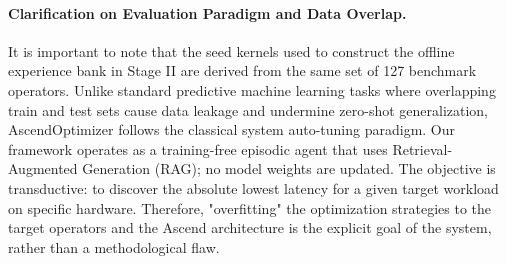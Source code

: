 \documentclass{article}
\theoremstyle{plain}
\theoremstyle{definition}
\theoremstyle{remark}
\begin{document}
\paragraph{Clarification on Evaluation Paradigm and Data Overlap.}
It is important to note that the seed kernels used to construct the offline experience bank in Stage II are derived from the same set of 127 benchmark operators. Unlike standard predictive machine learning tasks where overlapping train and test sets cause data leakage and undermine zero-shot generalization, AscendOptimizer follows the classical system auto-tuning paradigm. Our framework operates as a training-free episodic agent that uses Retrieval-Augmented Generation (RAG); no model weights are updated. The objective is transductive: to discover the absolute lowest latency for a given target workload on specific hardware. Therefore, "overfitting" the optimization strategies to the target operators and the Ascend architecture is the explicit goal of the system, rather than a methodological flaw.



\end{document}
